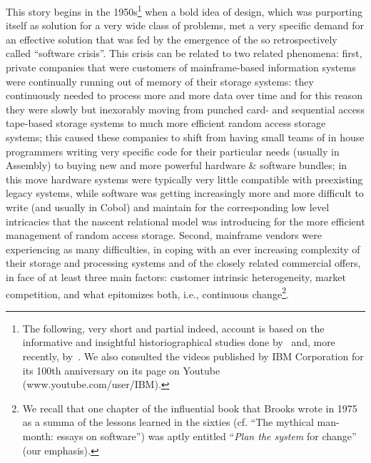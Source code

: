\documentclass{article}
\begin{document}
This story begins in the 1950s\footnote{The following, very short and partial indeed, account is based on the informative and insightful historiographical studies done by~\citet{campbell-kelly_computer:_2004} and, more recently, by~\citet{haigh_software_2002,haigh_crisis_2010,haigh_inventing_2011}. We also consulted the videos published by IBM Corporation for its 100th anniversary on its page on Youtube (www.youtube.com/user/IBM).} when a bold idea of design, which was purporting itself as solution for a very wide class of problems, met a very specific demand for an effective solution that was fed by the emergence of the so retrospectively called ``software crisis''\citep{haigh_crisis_2010}. This crisis can be related to two related phenomena: first, private companies that were customers of mainframe-based information systems were continually running out of memory of their storage systems: they continuously needed to process more and more data over time and for this reason they were slowly but inexorably moving from punched card- and sequential access tape-based storage systems to much more efficient random access storage systems; this caused these companies to shift from having small teams of in house  programmers writing very specific code for their particular needs (usually in Assembly) to buying new and more powerful hardware \& software bundles; in this move hardware systems were typically very little compatible with preexisting legacy systems, while software was getting increasingly more and more difficult to write (and usually in Cobol) and maintain for the corresponding low level intricacies that the nascent relational model was introducing for the more efficient management of random access storage. Second, mainframe vendors were experiencing as many difficulties, in coping with an ever increasing complexity of their storage and processing systems and of the closely related commercial offers, in face of at least three main factors: customer intrinsic heterogeneity, market competition, and what epitomizes both, i.e., continuous change\footnote{We recall that one chapter of the influential book that Brooks wrote in 1975 as a summa of the lessons learned in the sixties (cf. ``The mythical man-month: essays on software'') was aptly entitled ``\emph{Plan the system} for change'' (our emphasis).}. 
\end{document}
